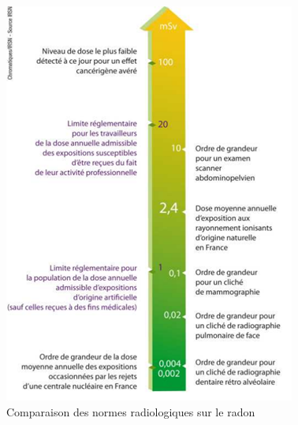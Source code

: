 \documentclass{article}
\begin{document}
\begin{figure}[H]
    \centering
    \includegraphics[width=\textwidth]{II_A2_5.png}
    \caption{Comparaison des normes radiologiques sur le radon}
    \label{fig:comparaison_normes}
\end{figure}
\end{document}
